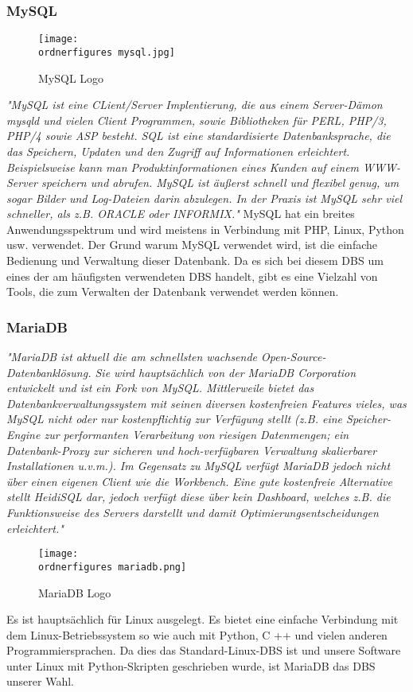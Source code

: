 \subsubsection{MySQL}
\begin{figure}
	\centering
	\texttt{[image: \\ordnerfigures mysql.jpg]}
	\caption{ MySQL Logo \cite{MySQLlogo}}
	\label{fig:mysql}
\end{figure}
\textit{"MySQL ist eine CLient/Server
Implentierung, die aus einem Server-Dämon mysqld und vielen Client Programmen, sowie
Bibliotheken für PERL, PHP/3, PHP/4 sowie ASP besteht.
SQL ist eine standardisierte Datenbanksprache, die das Speichern, Updaten und den Zugriff auf
Informationen erleichtert. Beispielsweise kann man Produktinformationen eines Kunden auf einem
WWW-Server speichern und abrufen. MySQL ist äußerst schnell und flexibel genug, um sogar Bilder
und Log-Dateien darin abzulegen. In der Praxis ist MySQL sehr viel schneller, als z.B. ORACLE oder INFORMIX."}\cite{stepken1999mysql}
\bigbreak
MySQL hat ein breites Anwendungsspektrum und wird meistens in Verbindung mit PHP, Linux, Python usw. verwendet. Der Grund warum MySQL verwendet wird, ist die einfache Bedienung und Verwaltung dieser Datenbank. Da es sich bei diesem DBS um eines der am häufigsten verwendeten DBS handelt, gibt es eine Vielzahl von Tools, die zum Verwalten der Datenbank verwendet werden können.

\subsubsection{MariaDB}
\textit{"MariaDB ist aktuell die am schnellsten wachsende Open-Source-Datenbanklösung. Sie wird hauptsächlich von der MariaDB Corporation entwickelt und ist ein Fork von MySQL. Mittlerweile bietet das Datenbankverwaltungssystem mit seinen diversen kostenfreien Features vieles, was MySQL nicht oder nur kostenpflichtig zur Verfügung stellt (z.B. eine Speicher-Engine zur performanten Verarbeitung von riesigen Datenmengen; ein Datenbank-Proxy zur sicheren und hoch-verfügbaren Verwaltung skalierbarer Installationen u.v.m.). Im Gegensatz zu MySQL verfügt MariaDB jedoch nicht über einen eigenen Client wie die Workbench. Eine gute kostenfreie Alternative stellt HeidiSQL dar, jedoch verfügt diese über kein Dashboard, welches z.B. die Funktionsweise des Servers darstellt und damit Optimierungsentscheidungen erleichtert."}\cite{MariaDB-Monitor}
\begin{figure}[h]
	\centering
	\texttt{[image: \\ordnerfigures mariadb.png]}
	\caption{ MariaDB Logo \cite{MariaDBlogo}}
	\label{fig:mariadb}
\end{figure}
\bigbreak
Es ist hauptsächlich für Linux ausgelegt. Es bietet eine einfache Verbindung mit dem Linux-Betriebssystem so wie auch mit Python, C ++ und vielen anderen Programmiersprachen. Da dies das Standard-Linux-DBS ist und unsere Software unter Linux mit Python-Skripten geschrieben wurde, ist MariaDB das DBS unserer Wahl.

